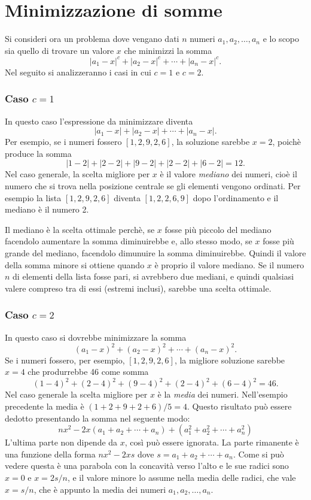 \section{Minimizzazione di somme}

Si consideri ora un problema dove vengano
dati $n$ numeri $a_1,a_2,\ldots,a_n$
e lo scopo sia quello di trovare un valore $x$
che minimizzi la somma
\[|a_1-x|^c+|a_2-x|^c+\cdots+|a_n-x|^c.\]
Nel seguito si analizzeranno i casi in cui $c=1$ e $c=2$.

\subsubsection{Caso $c=1$}

In questo caso l'espressione da minimizzare diventa
\[|a_1-x|+|a_2-x|+\cdots+|a_n-x|.\]
Per esempio, se i numeri fossero $[1,2,9,2,6]$,
la soluzione sarebbe $x=2$,
poichè produce la somma
\[
|1-2|+|2-2|+|9-2|+|2-2|+|6-2|=12.
\]
Nel caso generale, la scelta migliore per $x$
è il valore \textit{mediano} dei numeri,
cioè il numero che si trova nella posizione 
centrale se gli elementi vengono ordinati.
Per esempio la lista $[1,2,9,2,6]$
diventa $[1,2,2,6,9]$ dopo l'ordinamento e
il mediano è il numero 2.

Il mediano è la scelta ottimale
perchè, se $x$ fosse più piccolo del mediano
facendolo aumentare la somma diminuirebbe e,
allo stesso modo, se $x$ fosse più grande del mediano,
facendolo dimunuire la somma diminuirebbe.
Quindi il valore della somma minore si ottiene
quando $x$ è proprio il valore mediano.
Se il numero $n$ di elementi della lista fosse pari, 
si avrebbero due mediani, e quindi qualsiasi valere compreso
tra di essi (estremi inclusi), sarebbe
una scelta ottimale.

\subsubsection{Caso $c=2$}

In questo caso si dovrebbe minimizzare la somma
\[(a_1-x)^2+(a_2-x)^2+\cdots+(a_n-x)^2.\]
Se i numeri fossero, per esempio, $[1,2,9,2,6]$,
la migliore soluzione sarebbe $x=4$
che produrrebbe 46 come somma
\[
(1-4)^2+(2-4)^2+(9-4)^2+(2-4)^2+(6-4)^2=46.
\]
Nel caso generale la scelta migliore per $x$
è la \emph{media} dei numeri.
Nell'esempio precedente la media è $(1+2+9+2+6)/5=4$.
Questo risultato può essere dedotto presentando 
la somma nel seguente modo:
\[
nx^2 - 2x(a_1+a_2+\cdots+a_n) + (a_1^2+a_2^2+\cdots+a_n^2)
\]
L'ultima parte non dipende da $x$,
così può essere ignorata.
La parte rimanente è una funzione della forma
$nx^2-2xs$ dove $s=a_1+a_2+\cdots+a_n$.
Come si può vedere questa è una parabola con la concavità
verso l'alto e le sue radici sono
$x=0$ e $x=2s/n$,
e il valore minore lo assume nella media delle radici, 
che vale $x=s/n$, che è appunto la media dei numeri
$a_1,a_2,\ldots,a_n$.

